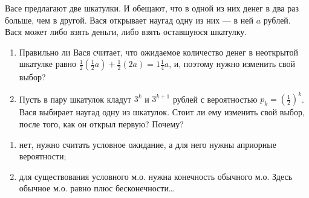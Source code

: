 



\begin{problem}\par
\begin{source}[3.7.18]\cite{binmore:fg}
\end{source}
Васе предлагают две шкатулки. И обещают, что в одной из них денег в два раз больше, чем в другой. Вася открывает наугад одну из них — в ней $a$  рублей. Вася может либо взять деньги, либо взять оставшуюся шкатулку.
\begin{enumerate}
\item Правильно ли Вася считает, что ожидаемое количество денег в неоткрытой шкатулке равно  $\frac{1}{2} \left(\frac{1}{2} a\right)+\frac{1}{2} \left(2a\right)=1\frac{1}{4} a$, и, поэтому нужно изменить свой выбор?\par
\item Пусть в пару шкатулок кладут  $3^{k} $  и  $3^{k+1} $  рублей с вероятностью  $p_{k} =\left(\frac{1}{2} \right)^{k} $. Вася выбирает наугад одну из шкатулок. Стоит ли ему изменить свой выбор, после того, как он открыл первую? Почему?\par
\end{enumerate}


\begin{sol}
\begin{enumerate}
\item
 нет, нужно считать условное ожидание, а для него нужны априорные вероятности;
 \item для существования условного м.о. нужна конечность обычного м.о. Здесь обычное м.о. равно плюс бесконечности\ldots
\end{enumerate}
\end{sol}
\end{problem}





